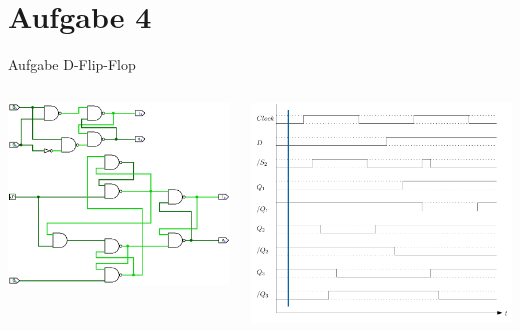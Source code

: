 
\section{Aufgabe 4}

\setcounter{exercise}{1}

\begin{frame}{Aufgabe \thesection}{D-Flip-Flop}
  \begin{solutionnoinc}
    \begin{columns}
      \begin{column}{0.5\textwidth}
        \includegraphics[height=0.5\paperheight, center]{./figures/comparison001.png}
      \end{column}
      \begin{column}{0.5\textwidth}
        \includegraphics[height=0.5\paperheight, center]{./figures/timing_diagram_1.png}
      \end{column}
    \end{columns}
  \end{solutionnoinc}
\end{frame}
